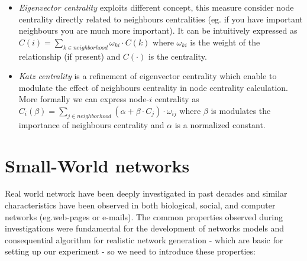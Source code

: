 \begin{description}
\begin{itemize}
\item \emph{Eigenvector centrality} exploits different concept, this measure consider node centrality directly related to neighbours centralities\cite{newman:2010} (eg. if you have important neighbours you are much more important). It can be intuitively expressed as $C(i)=\sum_{k \in neighborhood}{\omega_{ki} \cdot C(k)}$ where $\omega_{ki}$ is the weight of the relationship (if present) and $C(\cdot)$ is the centrality.
\item \emph{Katz centrality} is a refinement of eigenvector centrality which enable to modulate the effect of neighbours centrality in node centrality calculation. More formally we can express node-$i$ centrality as $C_{i}(\beta)= \sum_{j \in neighborhood}{(\alpha + \beta \cdot C_{j})\cdot \omega_{ij}}$ where $\beta$ is modulates the importance of neighbours centrality and $\alpha$ is a normalized constant.
\end{itemize}
\end{description}

\section{Small-World networks}
\label{sn_smallworld}
Real world network have been deeply investigated in past decades and similar characteristics have been observed in both biological, social, and computer networks (eg.web-pages or e-mails\cite{ebel02:_scale}). 
The common properties observed during investigations were fundamental for the development of networks models and consequential algorithm for realistic network generation - which are basic for setting up our experiment - so we need to introduce these properties:

